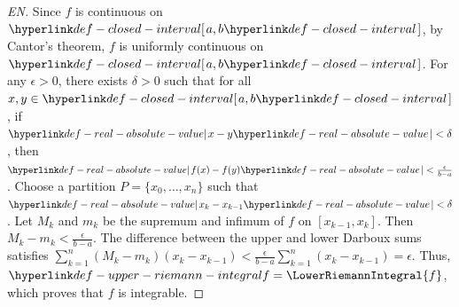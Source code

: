 \begin{proof}[EN]
Since $f$ is continuous on $\ClosedInterval{a, b}$, by Cantor's theorem, $f$ is uniformly continuous on $\ClosedInterval{a, b}$. For any $\epsilon > 0$, there exists $\delta > 0$ such that for all $x, y \in \ClosedInterval{a, b}$, if $\RealAbsoluteValue{x - y} < \delta$, then $\RealAbsoluteValue{f(x) - f(y)} < \frac{\epsilon}{b - a}$. Choose a partition $P = \{x_0, \dots, x_n\}$ such that $\RealAbsoluteValue{x_k - x_{k-1}} < \delta$. Let $M_k$ and $m_k$ be the supremum and infimum of $f$ on $[x_{k-1}, x_k]$. Then $M_k - m_k < \frac{\epsilon}{b - a}$. The difference between the upper and lower Darboux sums satisfies $\sum_{k=1}^n (M_k - m_k)(x_k - x_{k-1}) < \frac{\epsilon}{b - a} \sum_{k=1}^n (x_k - x_{k-1}) = \epsilon$. Thus, $\UpperRiemannIntegral{f} = \LowerRiemannIntegral{f}$, which proves that $f$ is integrable.
\end{proof}